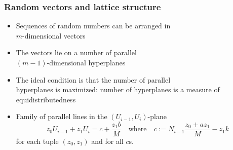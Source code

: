 \documentclass[10pt, serif, mathserif]{beamer}
\begin{document}
\begin{frame}
  \frametitle{Random vectors and lattice structure}
  \begin{itemize}
  	\item Sequences of random numbers can be arranged in \\ $m$-dimensional vectors
  	\item The vectors lie on a number of parallel \\ $(m-1)$-dimensional hyperplanes
  	\item The ideal condition is that the number of parallel \\ hyperplanes is maximized:
  	  number of hyperplanes is a measure of equidistributedness
  	\item Family of parallel lines in the $(U_{i-1},U_i)$-plane \[
  		z_0 U_{i-1} +z_1 U_i = c + \frac{z_1 b}{M} \quad \text{where} \quad c := N_{i-1}\frac{z_0 + az_1}{M} - z_1 k
  	  \] for each tuple $(z_0,z_1)$ and for all $c$s.
  \end{itemize}
\end{frame}
\end{document}
